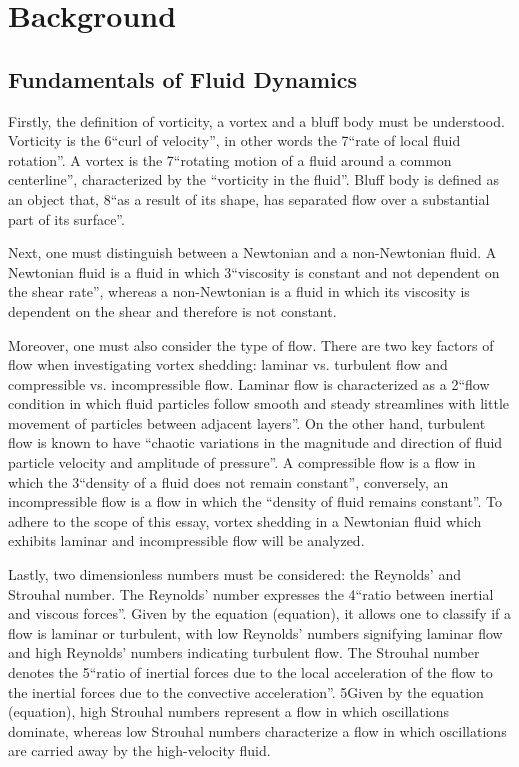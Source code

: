 \section*{Background}
\label{sec:background}

\subsection*{Fundamentals of Fluid Dynamics}
Firstly, the definition of vorticity, a vortex and a bluff body must be understood. Vorticity is the 6“curl of velocity”, in other words the 7“rate of local fluid rotation”. A vortex is the 7“rotating motion of a fluid around a common centerline”, characterized by the “vorticity in the fluid”. Bluff body is defined as an object that, 8“as a result of its shape, has separated flow over a substantial part of its surface”. 

Next, one must distinguish between a Newtonian and a non-Newtonian fluid. A Newtonian fluid is a fluid in which 3“viscosity is constant and not dependent on the shear rate”, whereas a non-Newtonian is a fluid in which its viscosity is dependent on the shear and therefore is not constant. 

Moreover, one must also consider the type of flow. There are two key factors of flow when investigating vortex shedding: laminar vs. turbulent flow and compressible vs. incompressible flow. Laminar flow is characterized as a 2“flow condition in which fluid particles follow smooth and steady streamlines with little movement of particles between adjacent layers”. On the other hand, turbulent flow is known to have “chaotic variations in the magnitude and direction of fluid particle velocity and amplitude of pressure”. A compressible flow is a flow in which the 3“density of a fluid does not remain constant”, conversely, an incompressible flow is a flow in which the “density of fluid remains constant”. To adhere to the scope of this essay, vortex shedding in a Newtonian fluid which exhibits laminar and incompressible flow will be analyzed.

Lastly, two dimensionless numbers must be considered: the Reynolds’ and Strouhal number. The Reynolds’ number expresses the 4“ratio between inertial and viscous forces”. Given by the equation (equation), it allows one to classify if a flow is laminar or turbulent, with low Reynolds’ numbers signifying laminar flow and high Reynolds’ numbers indicating turbulent flow. The Strouhal number denotes the 5“ratio of inertial forces due to the local acceleration of the flow to the inertial forces due to the convective acceleration”. 5Given by the equation (equation), high Strouhal numbers represent a flow in which oscillations dominate, whereas low Strouhal numbers characterize a flow in which oscillations are carried away by the high-velocity fluid.


